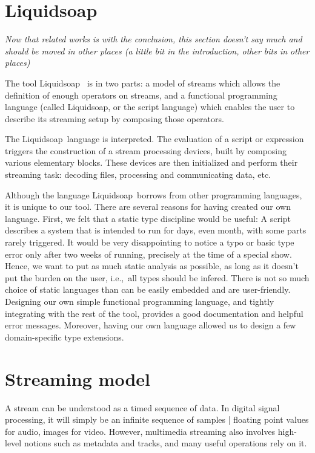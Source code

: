\documentclass{llncs}
\newcommand{\liquidsoap}{Liquidsoap}
\newcommand{\ie}{{i.e.,}}
\begin{document}
\section{\liquidsoap}

\emph{Now that related works is with the conclusion, this section doesn't say 
much and should be moved in other places (a little bit in the introduction,
other bits in other places)}

The tool \liquidsoap\ \cite{liquidsoap} is in two parts:
  a model of streams which allows the definition of enough
  operators on streams, and a functional programming language
  (called \liquidsoap, or the script language) which enables
  the user to describe its streaming setup by composing those operators.

The \liquidsoap\ language is interpreted.
The evaluation of a script or expression triggers the construction
of a stream processing devices, built by composing various elementary
blocks.
These devices are then initialized and perform their streaming task:
decoding files, processing and communicating data, etc.


Although the language \liquidsoap\ borrows from other programming
languages, it is unique to our tool.
There are several reasons for having created our own language.
First, we felt that a static type discipline would be useful:
A script describes a system that is intended to run for days,
even month, with some parts rarely triggered.
It would be very disappointing to notice a typo or basic type
error only after two weeks of running, precisely at the time
of a special show.
Hence, we want to put as much static analysis as possible,
as long as it doesn't put the burden on the user,
\ie\ all types should be infered.
There is not so much choice of static languages than can be
easily embedded and are user-friendly.
Designing our own simple functional programming language,
and tightly integrating with the rest of the tool,
provides a good documentation and helpful error messages.
Moreover, having our own language allowed us to design
a few domain-specific type extensions.


\section{Streaming model}
\label{sec:model}

A stream can be understood as a timed sequence of data.
In digital signal processing, it will simply be an infinite sequence of 
samples | floating point values for audio, images for video.
However, multimedia streaming also involves high-level notions such
as metadata and tracks, and many useful operations rely on it.
\end{document}
